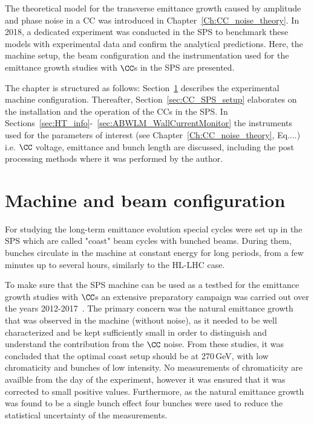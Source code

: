 \vspace*{-1mm}
The theoretical model for the transverse emittance growth caused by amplitude and phase noise in a CC was introduced in Chapter~\ref{Ch:CC_noise_theory}. In 2018, a dedicated experiment was conducted in the SPS to benchmark these models with experimental data and confirm the analytical predictions. Here, the machine setup, the beam configuration and the instrumentation used for the emittance growth studies with $\CC$s in the SPS are presented.


\begin{sloppypar} %
The chapter is structured as follows: Section~\ref{sec:SPS_setup}
describes the experimental machine configuration. Thereafter, Section~\ref{sec:CC_SPS_setup} elaborates on the installation and the operation of the CCs in the SPS. In Sections~\ref{sec:HT_info}-~\ref{sec:ABWLM_WallCurrentMonitor} the instruments used for the parameters of interest (see Chapter~\ref{Ch:CC_noise_theory}, Eq....) i.e. $\CC$ voltage, emittance and bunch length are discussed, including the post processing methods where it was performed by the author.
\end{sloppypar}


\section{Machine and beam configuration}\label{sec:SPS_setup}
For studying the long-term emittance evolution special cycles were set up in the SPS which are called "coast" beam cycles with bunched beams. During them, bunches circulate in the machine at constant energy for long periods, from a few minutes up to several hours, similarly to the HL-LHC case.

To make sure that the SPS machine can be used as a testbed for the emittance growth studies with $\CC$s an extensive preparatory campaign was carried out over the years 2012-2017~\cite{Calaga:1451286, Alekou_CC_coast_prep_2016, Antoniou:2649815}. The primary concern was the natural emittance growth that was observed in the machine (without noise), as it needed to be well characterized and be kept sufficiently small in order to distinguish and understand the contribution from the $\CC$ noise. From these studies, it was concluded that the optimal coast setup should be at 270\,GeV, with low chromaticity and bunches of low intensity. No measurements of chromaticity are availble from the day of the experiment, however it was ensured that it was corrected to small positive values. Furthermore, as the natural emittance growth was found to be a single bunch effect four bunches were used to reduce the statistical uncertainty of the measurements. 


